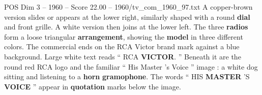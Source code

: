 \begin{textsample}{POS Dim 3 – 1960 – Score 22.00 – 1960/tv\_com\_1960\_97.txt}
A copper-brown version slides or appears at the lower right, similarly shaped with a round \textbf{dial} and front grille.
A white version then joins at the lower left.
The three \textbf{radios} form a loose triangular \textbf{arrangement}, showing the \textbf{model} in three different colors.
The commercial ends on the RCA Victor brand mark against a blue background.
Large white text reads “ RCA \textbf{VICTOR}. ” Beneath it are the round red RCA logo and the familiar “ His Master ’s Voice ” image : a white dog sitting and listening to a \textbf{horn} \textbf{gramophone}.
The words “ HIS \textbf{MASTER} ’S \textbf{VOICE} ” appear in \textbf{quotation} marks below the image.

\end{textsample}
